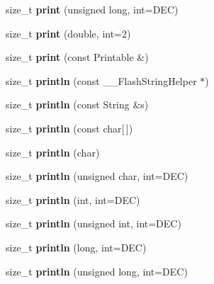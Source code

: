 \begin{DoxyCompactItemize}
size\+\_\+t {\bfseries print} (unsigned long, int=D\+EC)
\item 
\mbox{\label{class_print_ae8b4c025786c820afe0a90aeea01c9c5}} 
size\+\_\+t {\bfseries print} (double, int=2)
\item 
\mbox{\label{class_print_a901b0f06ae34aab31b8fbb4298f0596e}} 
size\+\_\+t {\bfseries print} (const Printable \&)
\item 
\mbox{\label{class_print_a4fd286b325d3b1a786cfa35072a8ef52}} 
size\+\_\+t {\bfseries println} (const \+\_\+\+\_\+\+Flash\+String\+Helper $\ast$)
\item 
\mbox{\label{class_print_afd6cc6e2c1163f94c60855ad233899bd}} 
size\+\_\+t {\bfseries println} (const String \&s)
\item 
\mbox{\label{class_print_ad337ce3f7977411b7d34d47a51e5737e}} 
size\+\_\+t {\bfseries println} (const char\mbox{[}$\,$\mbox{]})
\item 
\mbox{\label{class_print_a554896a71162f967b5794401239d7a01}} 
size\+\_\+t {\bfseries println} (char)
\item 
\mbox{\label{class_print_ac9afe80f50f0118d735295aec7727e50}} 
size\+\_\+t {\bfseries println} (unsigned char, int=D\+EC)
\item 
\mbox{\label{class_print_a738c88471cfb8eac7c8a804699971413}} 
size\+\_\+t {\bfseries println} (int, int=D\+EC)
\item 
\mbox{\label{class_print_ac87eed1fcb78641169ba2244278c899e}} 
size\+\_\+t {\bfseries println} (unsigned int, int=D\+EC)
\item 
\mbox{\label{class_print_a833fbec3ceba92e3ec95f51e026e4569}} 
size\+\_\+t {\bfseries println} (long, int=D\+EC)
\item 
\mbox{\label{class_print_aebee3c33ee5d8f10b6f378d5273742d0}} 
size\+\_\+t {\bfseries println} (unsigned long, int=D\+EC)
\item 
\mbox{\label{class_print_a56e976b079361b6021ef7c2bedb397a2}} 

\end{DoxyCompactItemize}
